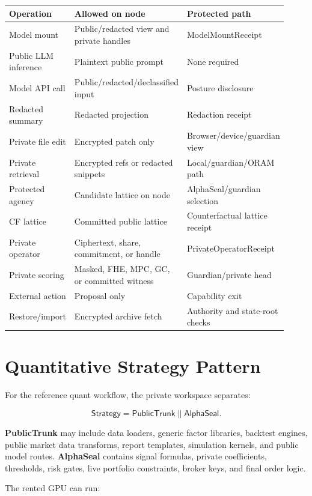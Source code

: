 \documentclass[11pt]{article}
\begin{document}
{\small
\begin{longtable}{p{0.20\linewidth}p{0.38\linewidth}p{0.34\linewidth}}
\toprule
\textbf{Operation} & \textbf{Allowed on node} & \textbf{Protected path} \\
\midrule
Model mount & Public/redacted view and private handles & ModelMountReceipt \\
Public LLM inference & Plaintext public prompt & None required \\
Model API call & Public/redacted/declassified input & Posture disclosure \\
Redacted summary & Redacted projection & Redaction receipt \\
Private file edit & Encrypted patch only & Browser/device/guardian view \\
Private retrieval & Encrypted refs or redacted snippets & Local/guardian/ORAM path \\
Protected agency & Candidate lattice on node & AlphaSeal/guardian selection \\
CF lattice & Committed public lattice & Counterfactual lattice receipt \\
Private operator & Ciphertext, share, commitment, or handle & PrivateOperatorReceipt \\
Private scoring & Masked, FHE, MPC, GC, or committed witness & Guardian/private head \\
External action & Proposal only & Capability exit \\
Restore/import & Encrypted archive fetch & Authority and state-root checks \\
\bottomrule
\end{longtable}
}

\section{Quantitative Strategy Pattern}

For the reference quant workflow, the private workspace separates:

\[
\mathsf{Strategy} =
\mathsf{PublicTrunk} \parallel \mathsf{AlphaSeal}.
\]

\textbf{PublicTrunk} may include data loaders, generic factor libraries,
backtest engines, public market data transforms, report templates, simulation
kernels, and public model routes. \textbf{AlphaSeal} contains signal formulas,
private coefficients, thresholds, risk gates, live portfolio constraints,
broker keys, and final order logic.

The rented GPU can run:
\end{document}
